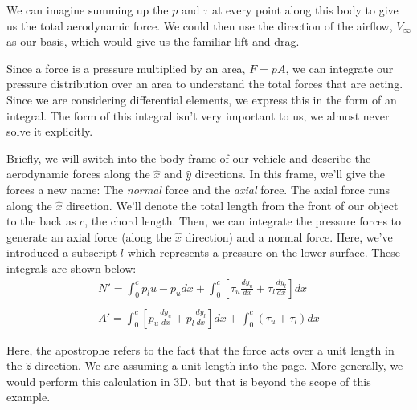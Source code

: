 \documentclass[10pt, openany, titlepage]{book}
\theoremstyle{definition}
\newcounter{example}[chapter]
\begin{document}
We can imagine summing up the $p$ and $\tau$ at every point along this body to give us the total aerodynamic force. We could then use the direction of the airflow, $V_\infty$ as our basis, which would give us the familiar lift and drag.

Since a force is a pressure multiplied by an area, $F=pA$, we can integrate our pressure distribution over an area to understand the total forces that are acting. Since we are considering differential elements, we express this in the form of an integral. The form of this integral isn't very important to us, we almost never solve it explicitly.

Briefly, we will switch into the body frame of our vehicle and describe the aerodynamic forces along the $\hat{x}$ and $\hat{y}$ directions. In this frame, we'll give the forces a new name: The \textit{normal} force and the \textit{axial} force. The axial force runs along the $\hat{x}$ direction. We'll denote the total length from the front of our object to the back as $c$, the chord length. Then, we can integrate the pressure forces to generate an axial force (along the $\hat{x}$ direction) and a normal force. Here, we've introduced a subscript $l$ which represents a pressure on the lower surface. These integrals are shown below:
\begin{gather}
    N'=\int_0^{c}{p_lu-p_u}{dx}+\int_0^{c}{\left[\tau_u\frac{dy_u}{dx} + \tau_l\frac{dy_l}{dx}\right]}{dx}\\\\
    A'=\int_0^{c}{\left[p_u\frac{dy_u}{dx} + p_l\frac{dy_l}{dx}\right]}{dx}+\int_0^c{(\tau_u+\tau_l)}{dx}
\end{gather}

Here, the apostrophe refers to the fact that the force acts over a unit length in the $\hat{z}$ direction. We are assuming a unit length into the page. More generally, we would perform this calculation in 3D, but that is beyond the scope of this example. 
\end{document}
